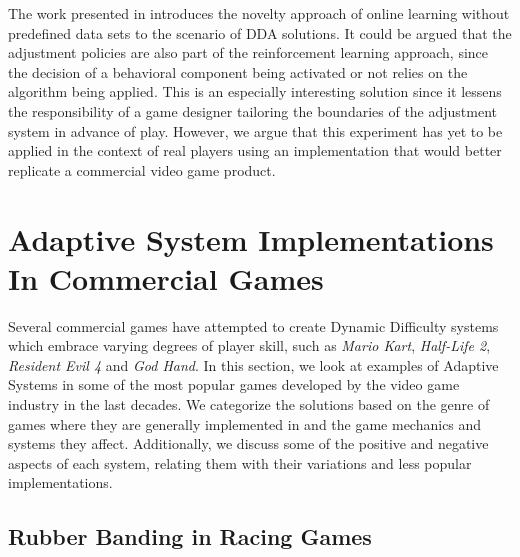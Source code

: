 The work presented in \cite{article_adaptivebehaviorai} introduces the novelty approach of online learning without predefined data sets to the scenario of DDA solutions. It could be argued that the adjustment policies are also part of the reinforcement learning approach, since the decision of a behavioral component being activated or not relies on the algorithm being applied. This is an especially interesting solution since it lessens the responsibility of a game designer tailoring the boundaries of the adjustment system in advance of play. However, we argue that this experiment has yet to be applied in the context of real players using an implementation that would better replicate a commercial video game product.


\section{Adaptive System Implementations In Commercial Games}

Several commercial games have attempted to create Dynamic Difficulty systems which embrace varying degrees of player skill, such as \emph{Mario Kart}, \emph{Half-Life 2}, \emph{Resident Evil 4} and \emph{God Hand}. In this section, we look at examples of Adaptive Systems in some of the most popular games developed by the video game industry in the last decades. We categorize the solutions based on the genre of games where they are generally implemented in and the game mechanics and systems they affect. Additionally, we discuss some of the positive and negative aspects of each system, relating them with their variations and less popular implementations.


\subsection{Rubber Banding in Racing Games}
\label{sec:rubber-banding-mario-kart}

